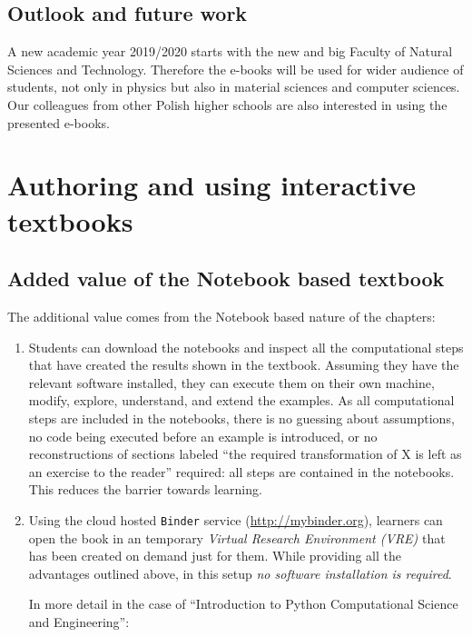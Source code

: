 \documentclass{deliverablereport}
\begin{document}
{{{\subsection{Outlook and future work}

A new academic year 2019/2020 starts with the new and big Faculty of
Natural Sciences and Technology. Therefore the e-books will be used
for wider audience of students, not only in physics but also in
material sciences and computer sciences. Our colleagues from other
Polish higher schools are also interested in using the presented
e-books.


\section{Authoring and using interactive textbooks}

\subsection{Added value of the Notebook based textbook}

The additional value comes from the \Jupyter Notebook based
nature of the chapters:

\begin{enumerate}
\item Students can download the notebooks and inspect all the
  computational steps that have created the results shown in the
  textbook. Assuming they have the relevant software installed,
  they can execute them on their own machine, modify,
  explore, understand, and extend the examples. As all computational
  steps are included in the notebooks, there is no guessing about
  assumptions, no code being executed before an example is introduced,
  or no reconstructions of sections labeled ``the required
  transformation of X is left as an exercise to the reader'' required:
  all steps are contained in the notebooks. This reduces the barrier
  towards learning.

\item
  Using the cloud hosted \texttt{Binder} service
  (\url{http://mybinder.org}), learners can open the book in an
  temporary \emph{Virtual Research Environment (VRE)} that has been
  created on demand just for them. While providing all the advantages
  outlined above, in this setup \emph{no software installation is
    required}.

  In more detail in the case of ``Introduction to Python Computational Science and Engineering'':


\end{enumerate}}}}
\end{document}
